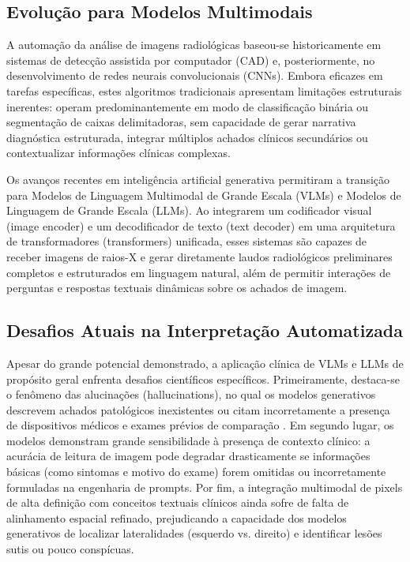 \documentclass[12pt,a4paper]{article}
\begin{document}
\subsection{Evolução para Modelos Multimodais}
A automação da análise de imagens radiológicas baseou-se historicamente em sistemas de detecção assistida por computador (CAD) e, posteriormente, no desenvolvimento de redes neurais convolucionais (CNNs). Embora eficazes em tarefas específicas, estes algoritmos tradicionais apresentam limitações estruturais inerentes: operam predominantemente em modo de classificação binária ou segmentação de caixas delimitadoras, sem capacidade de gerar narrativa diagnóstica estruturada, integrar múltiplos achados clínicos secundários ou contextualizar informações clínicas complexas.

Os avanços recentes em inteligência artificial generativa permitiram a transição para Modelos de Linguagem Multimodal de Grande Escala (VLMs) e Modelos de Linguagem de Grande Escala (LLMs). Ao integrarem um codificador visual (image encoder) e um decodificador de texto (text decoder) em uma arquitetura de transformadores (transformers) unificada, esses sistemas são capazes de receber imagens de raios-X e gerar diretamente laudos radiológicos preliminares completos e estruturados em linguagem natural, além de permitir interações de perguntas e respostas textuais dinâmicas sobre os achados de imagem.

\subsection{Desafios Atuais na Interpretação Automatizada}
Apesar do grande potencial demonstrado, a aplicação clínica de VLMs e LLMs de propósito geral enfrenta desafios científicos específicos. Primeiramente, destaca-se o fenômeno das alucinações (hallucinations), no qual os modelos generativos descrevem achados patológicos inexistentes ou citam incorretamente a presença de dispositivos médicos e exames prévios de comparação \cite{ostrovsky}. Em segundo lugar, os modelos demonstram grande sensibilidade à presença de contexto clínico: a acurácia de leitura de imagem pode degradar drasticamente se informações básicas (como sintomas e motivo do exame) forem omitidas ou incorretamente formuladas na engenharia de prompts. Por fim, a integração multimodal de pixels de alta definição com conceitos textuais clínicos ainda sofre de falta de alinhamento espacial refinado, prejudicando a capacidade dos modelos generativos de localizar lateralidades (esquerdo vs. direito) e identificar lesões sutis ou pouco conspícuas.
\end{document}

